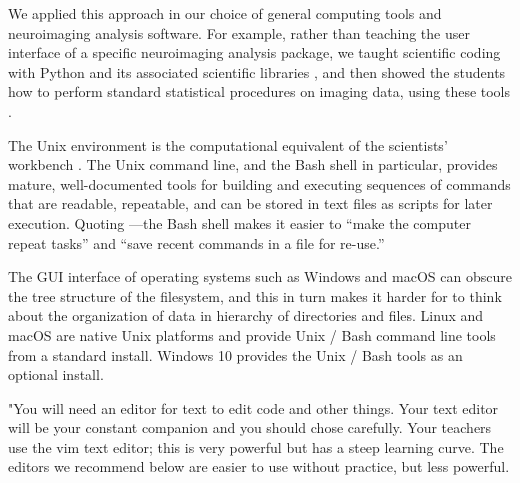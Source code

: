 We applied this approach in our choice of general computing tools and
neuroimaging analysis software.   For example, rather than teaching the user
interface of a specific neuroimaging analysis package, we taught scientific
coding with Python and its associated scientific libraries
\citep{millman2011python, perez2011python}, and then showed the students how to
perform standard statistical procedures on imaging data, using these tools
\citep{millman2007analysis}.


The Unix environment is the computational equivalent of the scientists'
workbench \citep{preeyanon2014reproducible}.  The Unix command line, and the
Bash shell in particular, provides mature, well-documented tools for building
and executing sequences of commands that are readable, repeatable, and can be
stored in text files as scripts for later execution.  Quoting
\cite{wilson2014best}---the Bash shell makes it easier to ``make the computer
repeat tasks'' and ``save recent commands in a file for re-use.''

The GUI interface of operating systems such as Windows and macOS can obscure
the tree structure of the filesystem, and this in turn makes it harder for
to think about the organization of data in hierarchy of
directories and files.  Linux and macOS are native Unix platforms and provide
Unix / Bash command line tools from a standard install.  Windows 10 provides
the Unix / Bash tools as an optional install.


"You will need an editor for text to edit code and other things.
Your text editor will be your constant companion and you should chose
carefully.
Your teachers use the vim text editor; this is very powerful but has a steep
learning curve. The editors we recommend below are easier to use without
practice, but less powerful.

